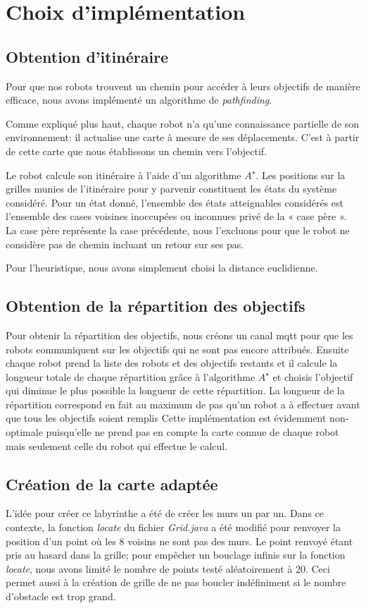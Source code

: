 \section{Choix d'implémentation}

\subsection{Obtention d'itinéraire}
Pour que nos robots trouvent un chemin pour accéder à leurs objectifs de manière efficace, nous avons implémenté un algorithme de \textit{pathfinding}.

Comme expliqué plus haut, chaque robot n'a qu'une connaissance partielle de son environnement: il actualise une carte à mesure de ses déplacements. C'est à partir de cette carte que nous établissons un chemin vers l'objectif. 

Le robot calcule son itinéraire à l'aide d'un algorithme $A^\star$. Les positions sur la grilles munies de l'itinéraire pour y parvenir constituent les états du système considéré. 
Pour un état donné, l’ensemble des états atteignables considérés est l’ensemble des cases voisines inoccupées ou inconnues privé de la « case père ». La case père représente la case précédente, nous l’excluons pour que le robot ne considère pas de chemin incluant un retour sur ses pas.

Pour l'heuristique, nous avons simplement choisi la distance euclidienne.

\subsection{Obtention de la répartition des objectifs}
Pour obtenir la répartition des objectifs, nous créons un canal mqtt pour que les robots communiquent sur les objectifs qui ne sont pas encore attribués. Ensuite chaque robot prend la liste des robots et des objectifs restants et il calcule la longueur totale de chaque répartition grâce à l'algorithme $A^\star$ et choisis l'objectif qui diminue le plus possible la longueur de cette répartition. La longueur de la répartition correspond en fait au maximum de pas qu'un robot a à effectuer avant que tous les objectifs soient remplis Cette implémentation est évidemment non-optimale puisqu'elle ne prend pas en compte la carte connue de chaque robot mais seulement celle du robot qui effectue le calcul.

\subsection{Création de la carte adaptée}
L'idée pour créer ce labyrinthe a été de créer les murs un par un. Dans ce contexte, la fonction \textit{locate} du fichier \textit{Grid.java} a été modifié pour renvoyer la position d'un point où les 8 voisins ne sont pas des murs. Le point renvoyé étant pris au hasard dans la grille; pour empêcher un bouclage infinis sur la fonction \textit{locate}, nous avons limité le nombre de points testé aléatoirement à 20. Ceci permet aussi à la création de grille de ne pas boucler indéfiniment si le nombre d'obstacle est trop grand.

